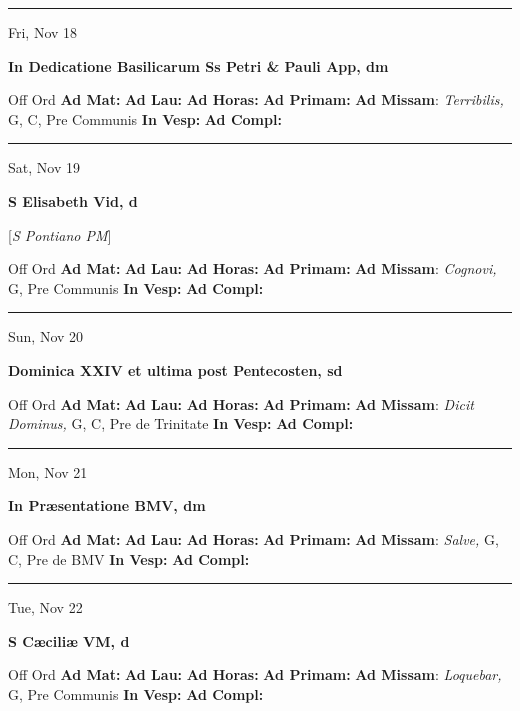 \documentclass[letterpaper, 10pt]{article}
\begin{document}
\hrule
\begin{center}
Fri, Nov 18
\end{center}\textbf{ \large In Dedicatione Basilicarum Ss Petri \& Pauli App, \textnormal{\normalsize dm}}
\begin{justify}
Off Ord
\textbf{Ad Mat: }
\textbf{Ad Lau: }
\textbf{Ad Horas: }
\textbf{Ad Primam: }
\textbf{Ad Missam}: \textit{Terribilis,} G, C, Pre Communis
\textbf{In Vesp: }
\textbf{Ad Compl: }\end{justify}



\hrule
\begin{center}
Sat, Nov 19
\end{center}\textbf{ \large S Elisabeth Vid, \textnormal{\normalsize d}}

[\textit{S Pontiano PM}]
\begin{justify}
Off Ord
\textbf{Ad Mat: }
\textbf{Ad Lau: }
\textbf{Ad Horas: }
\textbf{Ad Primam: }
\textbf{Ad Missam}: \textit{Cognovi,} G, Pre Communis
\textbf{In Vesp: }
\textbf{Ad Compl: }\end{justify}



\hrule
\begin{center}
Sun, Nov 20
\end{center}\textbf{ \large Dominica XXIV et ultima post Pentecosten, \textnormal{\normalsize sd}}
\begin{justify}
Off Ord
\textbf{Ad Mat: }
\textbf{Ad Lau: }
\textbf{Ad Horas: }
\textbf{Ad Primam: }
\textbf{Ad Missam}: \textit{Dicit Dominus,} G, C, Pre de Trinitate
\textbf{In Vesp: }
\textbf{Ad Compl: }\end{justify}



\hrule
\begin{center}
Mon, Nov 21
\end{center}\textbf{ \large In Præsentatione BMV, \textnormal{\normalsize dm}}
\begin{justify}
Off Ord
\textbf{Ad Mat: }
\textbf{Ad Lau: }
\textbf{Ad Horas: }
\textbf{Ad Primam: }
\textbf{Ad Missam}: \textit{Salve,} G, C, Pre de BMV
\textbf{In Vesp: }
\textbf{Ad Compl: }\end{justify}



\hrule
\begin{center}
Tue, Nov 22
\end{center}\textbf{ \large S Cæciliæ VM, \textnormal{\normalsize d}}
\begin{justify}
Off Ord
\textbf{Ad Mat: }
\textbf{Ad Lau: }
\textbf{Ad Horas: }
\textbf{Ad Primam: }
\textbf{Ad Missam}: \textit{Loquebar,} G, Pre Communis
\textbf{In Vesp: }
\textbf{Ad Compl: }\end{justify}
\end{document}
